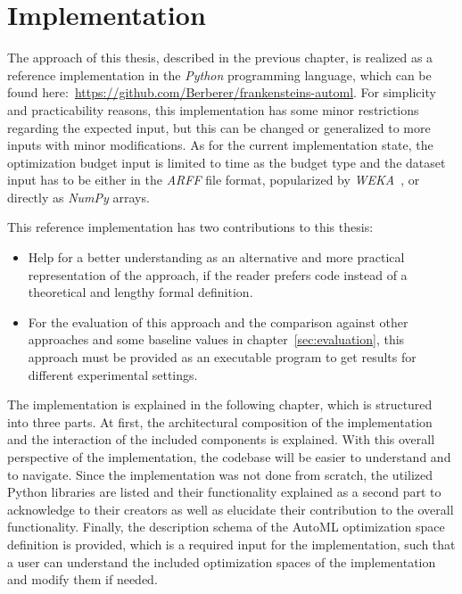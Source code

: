 %
\chapter{Implementation}
\label{sec:implementation}
The approach of this thesis, described in the previous chapter, is realized as a reference implementation in the \textit{Python} programming language, which can be found here:~\url{https://github.com/Berberer/frankensteins-automl}.\newline
For simplicity and practicability reasons, this implementation has some minor restrictions regarding the expected input, but this can be changed or generalized to more inputs with minor modifications.
As for the current implementation state, the optimization budget input is limited to time as the budget type and the dataset input has to be either in the \textit{ARFF} file format, popularized by \textit{WEKA}~\cite{Witten-Weka}, or directly as \textit{NumPy} arrays.

This reference implementation has two contributions to this thesis:
\begin{itemize}
	\item Help for a better understanding as an alternative and more practical representation of the approach, if the reader prefers code instead of a theoretical and lengthy formal definition.
	\item For the evaluation of this approach and the comparison against other approaches and some baseline values in chapter~\ref{sec:evaluation}, this approach must be provided as an executable program to get results for different experimental settings.
\end{itemize}

The implementation is explained in the following chapter, which is structured into three parts.
At first, the architectural composition of the implementation and the interaction of the included components is explained.
With this overall perspective of the implementation, the codebase will be easier to understand and to navigate.
Since the implementation was not done from scratch, the utilized Python libraries are listed and their functionality explained as a second part to acknowledge to their creators as well as elucidate their contribution to the overall functionality.
Finally, the description schema of the AutoML optimization space definition is provided, which is a required input for the implementation, such that a user can understand the included optimization spaces of the implementation and modify them if needed.

